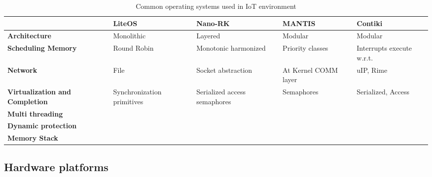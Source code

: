 \begin{table}[h!]
\scriptsize
\begin{tabulary}{\textwidth}{L|L|L|L|L}
	\                                  & \bf{LiteOS}                & \bf{Nano-RK}                  & \bf{MANTIS}          & \bf{Contiki} \\\hline
	\bf{Architecture}                  & Monolithic                 & Layered                       & Modular              & Modular \\\hline
	\bf{Scheduling Memory}             & Round Robin                & Monotonic harmonized          & Priority classes     & Interrupts execute w.r.t. \\\hline
	\bf{Network}                       & File                       & Socket abstraction            & At Kernel COMM layer & uIP, Rime \\\hline
	\bf{Virtualization and Completion} & Synchronization primitives & Serialized access  semaphores & Semaphores           & Serialized, Access \\\hline
	\bf{Multi threading}               & \ok                        & \ok                           & \ko                  & \ok \\\hline
	\bf{Dynamic protection}            & \ok                        & \ko                           & \ok                  & \ok \\\hline
	\bf{Memory Stack}                  & \ok                        & \ko                           & \ko                  & \ko \\\hline
\end{tabulary}
\caption{\label{tab:OS} Common operating systems used in IoT environment \cite{al-fuqaha_internet_24}}
\end{table}



\subsection{Hardware platforms}


